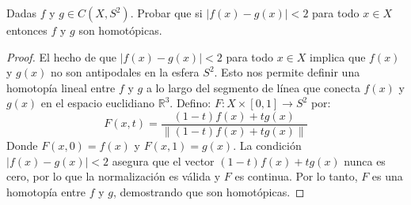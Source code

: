 \documentclass{article}
\theoremstyle{plain}
\theoremstyle{definition}
\newcommand{\R}{\mathbb{R}}
\newenvironment{ejercicio}[1]{\begin{trivlist}
\item[\hskip \labelsep {\bfseries Ejercicio}\hskip \labelsep {\bfseries #1.}]}{\end{trivlist}}
\begin{document}
\vspace{0.5cm}

\begin{ejercicio}{10}
    Dadas \( f \) y \( g \in C(X,S^{2}) \). Probar que si \( |f(x)-g(x)|<2 \) para todo \( x\in X \) entonces \( f \) y \( g \) son homotópicas.
\end{ejercicio}
\begin{proof}
    El hecho de que \( |f(x) - g(x)| < 2 \) para todo \( x \in X \) implica que \( f(x) \) y \( g(x) \) no son antipodales en la esfera \( S^2 \).
    Esto nos permite definir una homotopía lineal entre \( f \) y \( g \) a lo largo del segmento de línea que conecta \( f(x) \) y \( g(x) \) en el espacio euclidiano \( \R^3 \).
    Defino: \( F : X \times [0, 1] \to S^2 \) por:
    \[
        F(x, t) = \frac{(1-t)f(x) + t g(x)}{\| (1-t)f(x) + t g(x) \| }
    \]
    Donde \( F(x, 0) = f(x) \) y \( F(x, 1) = g(x) \).
    La condición \( |f(x) - g(x)| < 2 \) asegura que el vector \( (1-t)f(x) + t g(x) \) nunca es cero, por lo que la normalización es válida y \( F \) es continua.
    Por lo tanto, \( F \) es una homotopía entre \( f \) y \( g \), demostrando que son homotópicas.
\end{proof}

\vspace{0.5cm}
\end{document}
